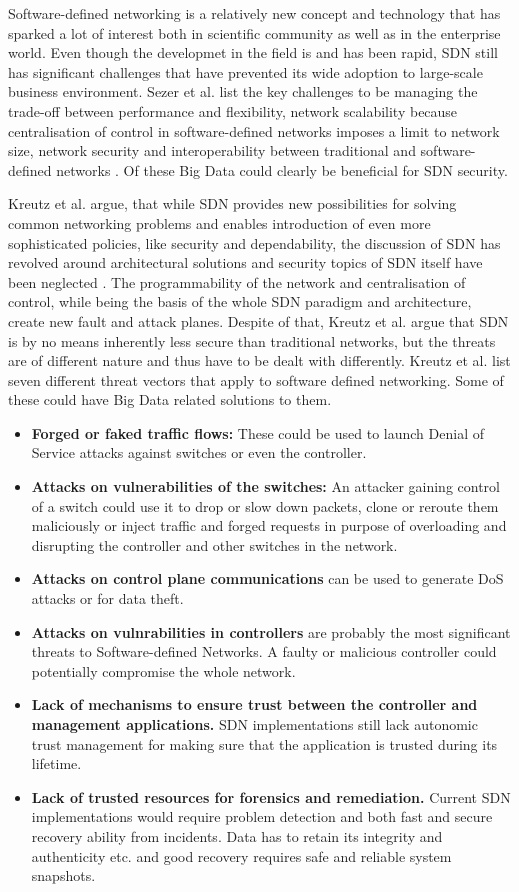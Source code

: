 \documentclass{acm_proc_article-sp}
\begin{document}
Software-defined networking is a relatively new concept and technology that has sparked a lot of interest both in scientific community as well as in the enterprise world. Even though the developmet in the field is and has been rapid, SDN still has significant challenges that have prevented its wide adoption to large-scale business environment. Sezer et al. list the key challenges to be managing the trade-off between performance and flexibility, network scalability because centralisation of control in software-defined networks imposes a limit to network size, network security and interoperability between traditional and software-defined networks \cite{sezer2013we}. Of these Big Data could clearly be beneficial for SDN security.

Kreutz et al. argue, that while SDN provides new possibilities for solving common networking problems and enables introduction of even more sophisticated policies, like security and dependability, the discussion of SDN has revolved around architectural solutions and security topics of SDN itself have been neglected  \cite{Kreutz13}. The programmability of the network and centralisation of control, while being the basis of the whole SDN paradigm and architecture, create new fault and attack planes. Despite of that, Kreutz et al. argue that SDN is by no means inherently less secure than traditional networks, but the threats are of different nature and thus have to be dealt with differently.
Kreutz et al. list seven different threat vectors that apply to software defined networking. Some of these could have Big Data related solutions to them.

\begin{itemize}
\item \textbf{Forged or faked traffic flows:} These could be used to launch Denial of Service attacks against switches or even the controller.
\item \textbf{Attacks on vulnerabilities of the switches:} An attacker gaining control of a switch could use it to drop or slow down packets, clone or reroute them maliciously or inject traffic and forged requests in purpose of overloading and disrupting the controller and other switches in the network.
\item \textbf{Attacks on control plane communications} can be used to generate DoS attacks or for data theft.
\item \textbf{Attacks on vulnrabilities in controllers} are probably the most significant threats to Software-defined Networks. A faulty or malicious controller could potentially compromise the whole network.
\item \textbf{Lack of mechanisms to ensure trust between the controller and management applications.} SDN implementations still lack autonomic trust management for making sure that the application is trusted during its lifetime.
\item \textbf{Lack of trusted resources for forensics and remediation.} Current SDN implementations would require problem detection and both fast and secure recovery ability from incidents. Data has to retain its integrity and authenticity etc. and good recovery requires safe and reliable system snapshots.
\end{itemize}
\end{document}
